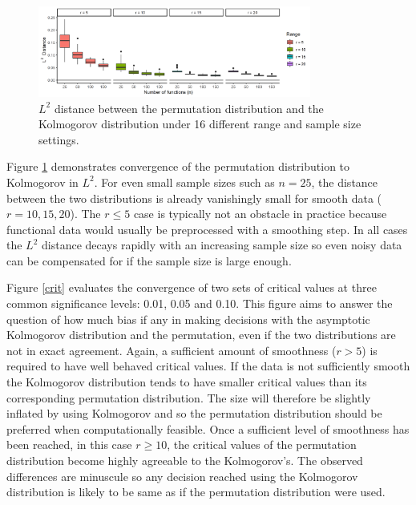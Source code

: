 \documentclass[12pt]{article}
\begin{document}
\begin{figure}
	\begin{center}
    \includegraphics[width=0.80\textwidth,valign=c]{conv/conv1.png}
    \caption{$L^2$ distance between the permutation distribution and the Kolmogorov distribution under 16 different range and sample size settings.}
    \label{rmse}
    \end{center}
\end{figure}

Figure \ref{rmse} demonstrates convergence of the permutation distribution to Kolmogorov in $L^2$. For even small sample sizes such as $n = 25$, the distance between the two distributions is already vanishingly small for smooth data ($r= 10, 15, 20$). The $r \leq 5$ case is typically not an obstacle in practice because functional data would usually be preprocessed with a smoothing step. In all cases the $L^2$ distance decays rapidly with an increasing sample size so even noisy data can be compensated for if the sample size is large enough.

Figure \ref{crit} evaluates the convergence of two sets of critical values at three common significance levels: 0.01, 0.05 and 0.10. This figure aims to answer the question of   how much bias if any in making decisions with the asymptotic Kolmogorov distribution and the permutation, even if the two distributions are not in exact agreement. 
Again, a sufficient amount of smoothness ($r > 5$) is required to have well behaved critical values. If the data is not sufficiently smooth the Kolmogorov distribution tends to have smaller critical values than its corresponding permutation distribution. The size will therefore be slightly inflated by using Kolmogorov and so the permutation distribution should be preferred when computationally feasible. Once a sufficient level of smoothness has been reached, in this case $r \geq 10$, the critical values of the permutation distribution become highly agreeable to the Kolmogorov's. The observed differences are minuscule so any decision reached using the Kolmogorov distribution is likely to be same as if the permutation distribution were used.
\end{document}
